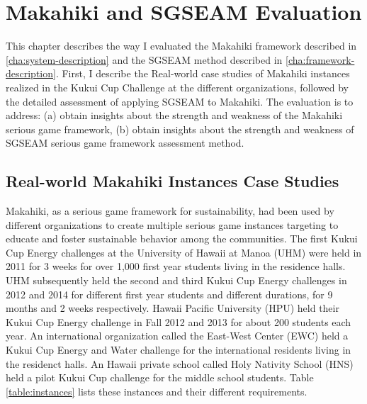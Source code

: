 \chapter{Makahiki and SGSEAM Evaluation}
\label{cha:evaluation}

This chapter describes the way I evaluated the Makahiki framework described in \autoref{cha:system-description} and the SGSEAM method described in \autoref{cha:framework-description}. First, I describe the Real-world case studies of Makahiki instances realized in the Kukui Cup Challenge at the different organizations, followed by the detailed assessment of applying SGSEAM to Makahiki. The evaluation is to address:
(a) obtain insights about the strength and weakness of the Makahiki serious game framework, (b) obtain insights about the strength and weakness of SGSEAM serious game framework assessment method.

\section{Real-world Makahiki Instances Case Studies}

Makahiki, as a serious game framework for sustainability, had been used by different organizations to create multiple serious game instances targeting to educate and foster sustainable behavior among the communities. The first Kukui Cup Energy challenges at the University of Hawaii at Manoa (UHM) were held in 2011 for 3 weeks for over 1,000 first year students living in the residence halls. UHM subsequently held the second and third Kukui Cup Energy challenges in 2012 and 2014 for different first year students and different durations, for 9 months and 2 weeks respectively. Hawaii Pacific University (HPU) held their Kukui Cup Energy challenge in Fall 2012 and 2013 for about 200 students each year. An international organization called the East-West Center (EWC) held a Kukui Cup Energy and Water challenge for the international residents living in the residenct halls. An Hawaii private school called Holy Nativity School (HNS) held a pilot Kukui Cup challenge for the middle school students. Table \autoref{table:instances} lists these instances and their different requirements.


